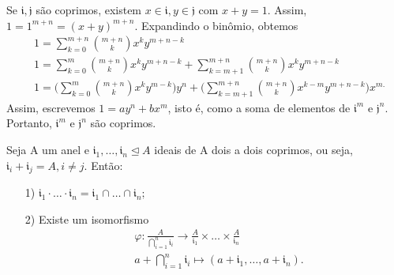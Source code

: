 \documentclass[AlgebraII/algebraII_notes.tex]{subfiles}
\begin{document}
\begin{proof*}
	Se \(\mathfrak{i}, \mathfrak{j}\) são coprimos, existem \(x\in \mathfrak{i}, y\in \mathfrak{j}\) com \(x+y = 1.\)
	Assim, \(1 = 1^{m+n} = (x+y)^{m+n}.\) Expandindo o binômio, obtemos
	\begin{align*}
		 & 1 = \sum\limits_{k=0}^{m+n}\binom{m+n}{k}x^{k}y^{m+n-k}                                                                                            \\
		 & 1 = \sum\limits_{k=0}^{m}\binom{m+n}{k}x^{k}y^{m+n-k} + \sum\limits_{k=m+1}^{m+n}\binom{m+n}{k}x^{k}y^{m+n-k}                                      \\
		 & 1 = \biggl(\sum\limits_{k=0}^{m}\binom{m+n}{k}x^{k}y^{m-k}\biggr)y^{n}+\biggl(\sum\limits_{k=m+1}^{m+n}\binom{m+n}{k}x^{k-m}y^{m+n-k}\biggr)x^{m.}
	\end{align*}
	Assim, escrevemos \(1 = ay^{n}+bx^{m}\), isto é, como a soma de elementos de \(\mathfrak{i}^{m}\) e \(\mathfrak{j}^{n}.\) Portanto,
	\(\mathfrak{i}^{m}\) e \(\mathfrak{j}^{n}\) são coprimos. \qedsymbol
\end{proof*}
\hypertarget{chinese_remainder}{
	\begin{theorem*}
		Seja A um anel e \(\mathfrak{i}_{1},\dotsc,\mathfrak{i}_{n}\trianglelefteq{A}\) ideais de A dois a dois coprimos, ou seja,
		\(\mathfrak{i}_{i}+\mathfrak{i}_{j}=A, i\neq j.\) Então:
		\begin{itemize}
			\item[1)] \(\mathfrak{i}_{1}\cdot \dotsc \cdot \mathfrak{i}_{n} = \mathfrak{i}_{1}\cap \dotsc\cap \mathfrak{i}_{n};\)
			\item[2)] Existe um isomorfismo
			      \begin{align*}
				       & \varphi :\frac{A}{\bigcap_{i=1}^{n}\mathfrak{i}_{i}}\rightarrow \frac{A}{\mathfrak{i}_{1}}\times \dotsc\times \frac{A}{\mathfrak{i}_{n}} \\
				       & a+\bigcap_{i=1}^{n}\mathfrak{i}_{i}\mapsto(a+\mathfrak{i}_{1}, \dotsc, a+\mathfrak{i}_{n}).
			      \end{align*}
		\end{itemize}
	\end{theorem*}}
\end{document}
